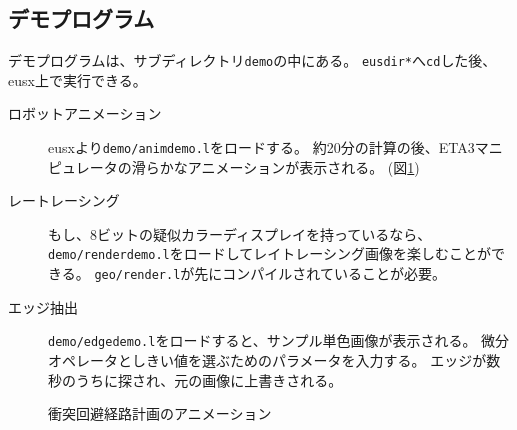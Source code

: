 \subsection{デモプログラム}
デモプログラムは、サブディレクトリ{\tt demo}の中にある。
{\tt *eusdir*}へ{\tt cd}した後、eusx上で実行できる。
\begin{description}
\item[ロボットアニメーション] 
eusxより{\tt demo/animdemo.l}をロードする。
約20分の計算の後、ETA3マニピュレータの滑らかなアニメーションが表示される。
(図\ref{animdemo})
\item[レートレーシング] 
もし、8ビットの疑似カラーディスプレイを持っているなら、
{\tt demo/renderdemo.l}をロードしてレイトレーシング画像を楽しむことができる。
{\tt geo/render.l}が先にコンパイルされていることが必要。
\item[エッジ抽出]
{\tt demo/edgedemo.l}をロードすると、サンプル単色画像が表示される。
微分オペレータとしきい値を選ぶためのパラメータを入力する。
エッジが数秒のうちに探され、元の画像に上書きされる。
\end{description}

\begin{figure}
\caption{\label{animdemo}衝突回避経路計画のアニメーション}
\end{figure}



\newpage


